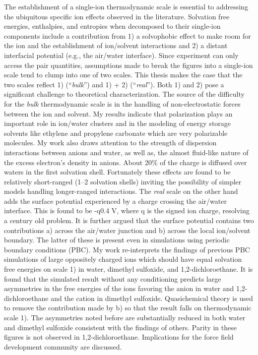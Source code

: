 \textbf{}

\vcinfo{}

The establishment of a single-ion thermodynamic scale is essential to addressing the ubiquitous specific ion effects observed in the literature. Solvation free energies,
enthalpies, and entropies when decomposed to their single-ion components include a contribution from 1) a solvophobic effect to make room for the ion and the establishment
of ion/solvent interactions and 2) a distant interfacial potential (e.g., the air/water interface). Since experiment can only access the pair quantities, assumptions made
to break the figures into a single-ion scale tend to clump into one of two scales. This thesis makes the case that the two scales reflect 1) (``\emph{bulk}'') and 1) + 2)
(``\emph{real}''). Both 1) and 2) pose a significant challenge to theoretical characterization. The source of the difficulty for the \emph{bulk} thermodynamic scale is in
the handling of non-electrostatic forces between the ion and solvent. My results indicate that polarization plays an important role in ion/water clusters and in the modeling
of energy storage solvents like ethylene and propylene carbonate which are very polarizable molecules. My work also draws attention to the strength of dispersion interactions
between anions and water, as well as, the almost fluid-like nature of the excess electron's density in anions. About 20\% of the charge is diffused over waters in the first
solvation shell. Fortunately these effects are found to be relatively short-ranged (1--2 solvation shells) inviting the possibility of simpler models handling longer-ranged
interactions. The \emph{real} scale on the other hand adds the surface potential experienced by a charge crossing the air/water interface. This is found to be -q0.4 V, 
where q is the signed ion charge, resolving a century old problem. It is further argued that the surface potential contains two contributions a) across the air/water junction 
and b) across the local ion/solvent boundary. The latter of these is present even in simulations using periodic boundary conditions (PBC). My work re-interprets the findings
of previous PBC simulations of large oppositely charged ions which should have equal solvation free energies on scale 1) in water, dimethyl sulfoxide, and 1,2-dichloroethane.
It is found that the simulated result without any conditioning predicts large asymmetries in the free energies of the ions favoring the anion in water and 1,2-dichloroethane 
and the cation in dimethyl sulfoxide. Quasichemical theory is used to remove the contribution made by b) so that the result falls on thermodynamic scale 1). The asymmetries 
noted before are substantially reduced in both water and dimethyl sulfoxide consistent with the findings of others. Parity in these figures is not observed in 1,2-dichloroethane.
Implications for the force field development community are discussed.

\vspace{6mm}



